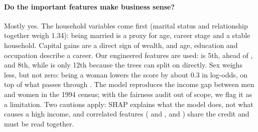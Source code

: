 \paragraph{Do the important features make business sense?} Mostly yes. The
household variables come first (marital status and relationship together weigh
1.34): being married is a proxy for age, career stage and a stable household.
Capital gains are a direct sign of wealth, and age, education and occupation
describe a career. Our engineered features are used: 
is 5th, ahead of , and  8th, while
 is only 12th because the trees can split on
 directly. Sex weighs less, but not zero: being a woman
lowers the score by about $0.3$ in log-odds, on top of what passes through
. The model reproduces the income gap between men and women
in the 1994 census; with the fairness audit out of scope, we flag it as a
limitation. Two cautions apply: SHAP explains what the model does, not what
causes a high income, and correlated features ( and
,  and ) share the
credit and must be read together.
